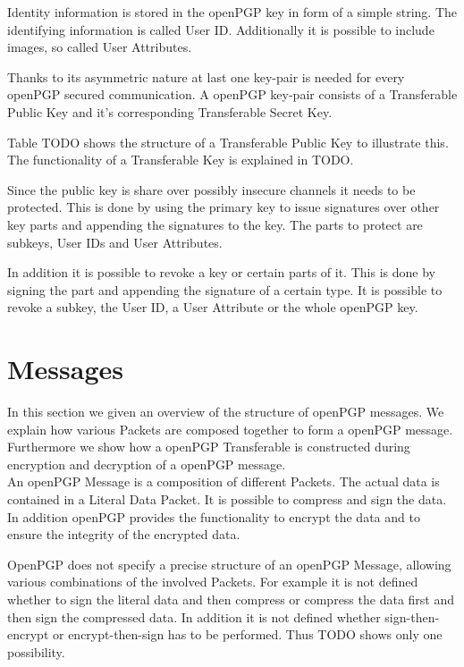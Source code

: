 Identity information is stored in the openPGP key in form of a simple string. The identifying information is called User ID. Additionally it is possible to include images, so called User Attributes.

Thanks to its asymmetric nature at last one key-pair is needed for every openPGP secured communication. A openPGP key-pair consists of a Transferable Public Key and it's corresponding Transferable Secret Key. 

Table TODO shows the structure of a Transferable Public Key to illustrate this. The functionality of a Transferable  Key is explained in  TODO.


Since the public key is share over possibly insecure channels it needs to be protected. This is done by using the primary key to issue signatures over other key parts and appending the signatures to the key. The parts to protect are subkeys, User IDs and User Attributes.


In addition it is possible to revoke a key or certain parts of it. This is done by signing the part and appending the signature of a certain type. It is possible to revoke a subkey, the User ID, a User Attribute or the whole openPGP key.

\section{Messages}

In this section we given an overview of the structure of openPGP messages. We explain how various Packets are composed together to form a openPGP message. Furthermore we show how a openPGP Transferable is constructed during encryption and decryption of a openPGP message. \\

An openPGP Message is a composition of different Packets. The actual data is contained in a Literal Data Packet. It is possible to compress and sign the data. In addition openPGP provides the functionality to encrypt the data and to ensure the integrity of the encrypted data.

OpenPGP does not specify a precise structure of an openPGP Message, allowing various combinations of the involved Packets. For example it is not defined whether to sign the literal data and then compress or compress the data first and then sign the compressed data. In addition it is not defined whether sign-then-encrypt or encrypt-then-sign has to be performed.  Thus TODO shows only one possibility.

